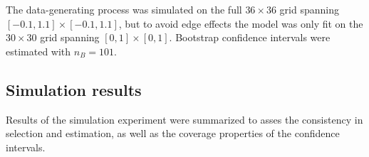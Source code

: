 \documentclass[authoryear, review, 11pt]{elsarticle}
\begin{document}
	The data-generating process was simulated on the full $36 \times 36$ grid spanning $[-0.1,1.1] \times [-0.1,1.1]$, but to avoid edge effects the model was only fit on the $30 \times 30$ grid spanning $[0,1] \times [0,1]$. Bootstrap confidence intervals were estimated with $n_B = 101$.
	
	\subsection{Simulation results}
	Results of the simulation experiment were summarized to asses the consistency in selection and estimation, as well as the coverage properties of the confidence intervals.
		

\end{document}
